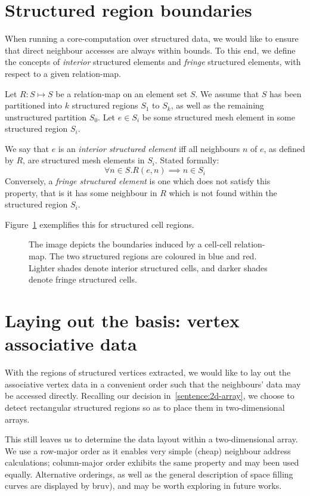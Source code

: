 
\section{Structured region boundaries}
When running a core-computation over structured data, we would like to ensure that direct neighbour accesses are always within bounds. To this end, we define the concepts of \emph{interior} structured elements and \emph{fringe} structured elements, with respect to a given relation-map.

Let $R: S \mapsto S$ be a relation-map on an element set $S$. We assume that $S$ has been partitioned into $k$ structured regions $S_1$ to $S_k$, as well as the remaining unstructured partition $S_0$.
Let $e \in S_i$ be some structured mesh element in some structured region $S_i$.

We say that $e$ is an \emph{interior structured element} iff all neighbours $n$ of $e$, as defined by $R$, are structured mesh elements in $S_i$. Stated formally:
$$\forall n \in S. R(e,n) \implies n \in S_i$$
Conversely, a \emph{fringe structured element} is one which does not satisfy this property, that is it has some neighbour in $R$ which is not found within the structured region $S_i$.

Figure~\ref{fig:fringe-cells} exemplifies this for structured cell regions.

\begin{figure}

\caption{The image depicts the boundaries induced by a cell-cell relation-map. The two structured regions are coloured in blue and red. Lighter shades denote interior structured cells, and darker shades denote fringe structured cells.}
\label{fig:fringe-cells}
\end{figure}


\section{Laying out the basis: vertex associative data}
\label{subsec:vertex-associative-data}
With the regions of structured vertices extracted, we would like to lay out the associative vertex data in a convenient order such that the neighbours' data may be accessed directly. Recalling our decision in~\ref{sentence:2d-array}, we choose to detect rectangular structured regions so as to place them in two-dimensional arrays.

This still leaves us to determine the data layout within a two-dimensional array. We use a row-major order as it enables very simple (cheap) neighbour address calculations; column-major order exhibits the same property and may been used equally. Alternative orderings, as well as the general description of space filling curves are displayed by bruv), and may be worth exploring in future works.

